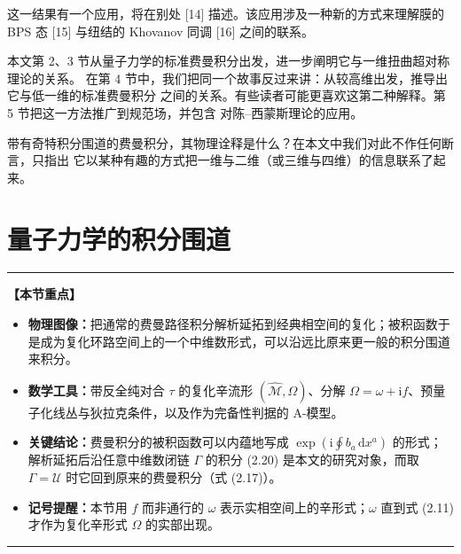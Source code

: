 \documentclass[11pt,a4paper,UTF8]{ctexart}
\theoremstyle{plain}
\theoremstyle{definition}
\newenvironment{keypoints}{%
  \par\addvspace{0.9em}%
  \noindent\begin{minipage}{\linewidth}%
  \color{black!80}\rule{\linewidth}{0.6pt}\par\vspace{2pt}%
  \noindent\textbf{【本节重点】}\par\vspace{2pt}%
  \begin{itemize}[leftmargin=1.6em,itemsep=1pt,topsep=2pt,parsep=0pt]%
}{%
  \end{itemize}\vspace{1pt}\noindent\color{black!80}\rule{\linewidth}{0.6pt}%
  \end{minipage}\par\addvspace{0.9em}%
}
\begin{document}
这一结果有一个应用，将在别处 [14] 描述。该应用涉及一种新的方式来理解膜的 BPS 态 [15]
与纽结的 Khovanov 同调 [16] 之间的联系。

本文第 2、3 节从量子力学的标准费曼积分出发，进一步阐明它与一维扭曲超对称理论的关系。
在第 4 节中，我们把同一个故事反过来讲：从较高维出发，推导出它与低一维的标准费曼积分
之间的关系。有些读者可能更喜欢这第二种解释。第 5 节把这一方法推广到规范场，并包含
对陈--西蒙斯理论的应用。

带有奇特积分围道的费曼积分，其物理诠释是什么？在本文中我们对此不作任何断言，只指出
它以某种有趣的方式把一维与二维（或三维与四维）的信息联系了起来。





\section{量子力学的积分围道}

\begin{keypoints}
    \item \textbf{物理图像：}把通常的费曼路径积分解析延拓到经典相空间的复化；被积函数于是成为复化环路空间上的一个中维数形式，可以沿远比原来更一般的积分围道来积分。
    \item \textbf{数学工具：}带反全纯对合 $\tau$ 的复化辛流形 $(\widehat{\mathcal{M}},\Omega)$、分解 $\Omega=\omega+\mathrm{i}f$、预量子化线丛与狄拉克条件，以及作为完备性判据的 A-模型。
    \item \textbf{关键结论：}费曼积分的被积函数可以内蕴地写成 $\exp(\mathrm{i}\oint b_a\,\mathrm{d}x^a)$ 的形式；解析延拓后沿任意中维数闭链 $\Gamma$ 的积分 (2.20) 是本文的研究对象，而取 $\Gamma=\mathcal{U}$ 时它回到原来的费曼积分（式 (2.17)）。
    \item \textbf{记号提醒：}本节用 $f$ 而非通行的 $\omega$ 表示实相空间上的辛形式；$\omega$ 直到式 (2.11) 才作为复化辛形式 $\Omega$ 的实部出现。
\end{keypoints}
\end{document}
